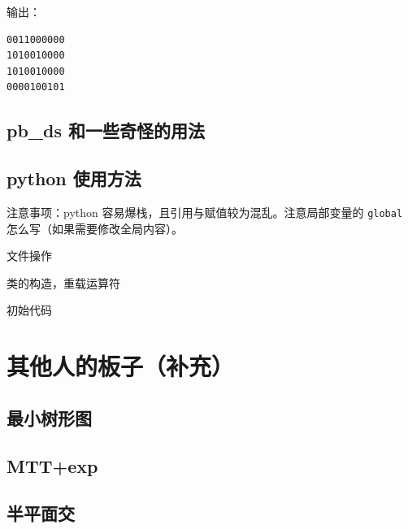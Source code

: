 \documentclass[12pt]{ctexart}
\begin{document}


输出：

\begin{verbatim}
0011000000
1010010000
1010010000
0000100101
\end{verbatim}

\subsection{pb\_ds 和一些奇怪的用法}



\subsection{python 使用方法}

注意事项：python 容易爆栈，且引用与赋值较为混乱。注意局部变量的 \verb|global| 怎么写（如果需要修改全局内容）。

文件操作




类的构造，重载运算符


初始代码



\newpage

\section{其他人的板子（补充）}
\subsection{最小树形图}


\subsection{MTT+exp}



\subsection{半平面交}


\end{document}
